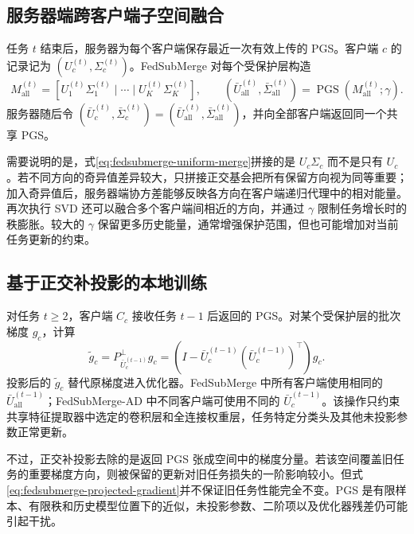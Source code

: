 \subsection{服务器端跨客户端子空间融合}
\label{subsec:fedsubmerge-server-merge}

任务 $t$ 结束后，服务器为每个客户端保存最近一次有效上传的 PGS。客户端 $c$ 的记录记为
$(U_c^{(t)},\Sigma_c^{(t)})$。FedSubMerge 对每个受保护层构造
\begin{equation}
M_{\mathrm{all}}^{(t)}
=
\left[
U_1^{(t)}\Sigma_1^{(t)}
\mid\cdots\mid
U_K^{(t)}\Sigma_K^{(t)}
\right],
\qquad
(\bar U_{\mathrm{all}}^{(t)},\bar\Sigma_{\mathrm{all}}^{(t)})
=
\operatorname{PGS}\!\left(M_{\mathrm{all}}^{(t)};\gamma\right).
\label{eq:fedsubmerge-uniform-merge}
\end{equation}
服务器随后令
$(\bar U_c^{(t)},\bar\Sigma_c^{(t)})=(\bar U_{\mathrm{all}}^{(t)},\bar\Sigma_{\mathrm{all}}^{(t)})$，并向全部客户端返回同一个共享 PGS。

需要说明的是，式\eqref{eq:fedsubmerge-uniform-merge}拼接的是 $U_c\Sigma_c$ 而不是只有 $U_c$。若不同方向的奇异值差异较大，只拼接正交基会把所有保留方向视为同等重要；加入奇异值后，服务器端协方差能够反映各方向在客户端递归代理中的相对能量。再次执行 SVD 还可以融合多个客户端间相近的方向，并通过 $\gamma$ 限制任务增长时的秩膨胀。较大的 $\gamma$ 保留更多历史能量，通常增强保护范围，但也可能增加对当前任务更新的约束。

\subsection{基于正交补投影的本地训练}
\label{subsec:fedsubmerge-local-projection}

对任务 $t\geq2$，客户端 $C_c$ 接收任务 $t-1$ 后返回的 PGS。对某个受保护层的批次梯度 $g_c$，计算
\begin{equation}
\widetilde g_c
=
P_{\bar U_c^{(t-1)}}^{\perp}g_c
=
\left(I-\bar U_c^{(t-1)}(\bar U_c^{(t-1)})^{\top}\right)g_c.
\label{eq:fedsubmerge-projected-gradient}
\end{equation}
投影后的 $\widetilde g_c$ 替代原梯度进入优化器。FedSubMerge 中所有客户端使用相同的 $\bar U_{\mathrm{all}}^{(t-1)}$；FedSubMerge-AD 中不同客户端可使用不同的 $\bar U_c^{(t-1)}$。该操作只约束共享特征提取器中选定的卷积层和全连接权重层，任务特定分类头及其他未投影参数正常更新。

不过，正交补投影去除的是返回 PGS 张成空间中的梯度分量。若该空间覆盖旧任务的重要梯度方向，则被保留的更新对旧任务损失的一阶影响较小。但式\eqref{eq:fedsubmerge-projected-gradient}并不保证旧任务性能完全不变。PGS 是有限样本、有限秩和历史模型位置下的近似，未投影参数、二阶项以及优化器残差仍可能引起干扰。

